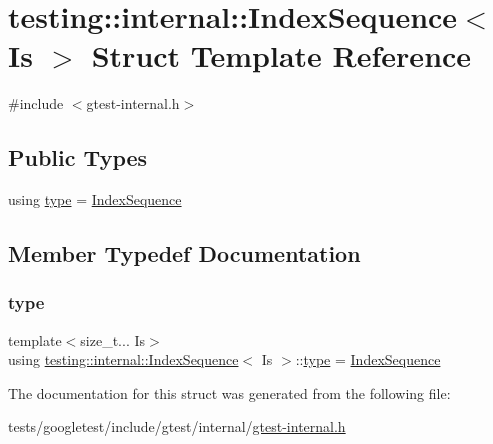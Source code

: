\hypertarget{structtesting_1_1internal_1_1IndexSequence}{}\section{testing\+:\+:internal\+:\+:Index\+Sequence$<$ Is $>$ Struct Template Reference}
\label{structtesting_1_1internal_1_1IndexSequence}


{\ttfamily \#include $<$gtest-\/internal.\+h$>$}

\subsection*{Public Types}
\begin{DoxyCompactItemize}
\item 
using \hyperlink{structtesting_1_1internal_1_1IndexSequence_a89bb13a7b5d169b69659f395dcec2b2d}{type} = \hyperlink{structtesting_1_1internal_1_1IndexSequence}{Index\+Sequence}
\end{DoxyCompactItemize}


\subsection{Member Typedef Documentation}
\mbox{\label{structtesting_1_1internal_1_1IndexSequence_a89bb13a7b5d169b69659f395dcec2b2d}} 
\subsubsection{\texorpdfstring{type}{type}}
{\footnotesize\ttfamily template$<$size\+\_\+t... Is$>$ \\
using \hyperlink{structtesting_1_1internal_1_1IndexSequence}{testing\+::internal\+::\+Index\+Sequence}$<$ Is $>$\+::\hyperlink{structtesting_1_1internal_1_1IndexSequence_a89bb13a7b5d169b69659f395dcec2b2d}{type} =  \hyperlink{structtesting_1_1internal_1_1IndexSequence}{Index\+Sequence}}



The documentation for this struct was generated from the following file\+:\begin{DoxyCompactItemize}
\item 
tests/googletest/include/gtest/internal/\hyperlink{gtest-internal_8h}{gtest-\/internal.\+h}\end{DoxyCompactItemize}
